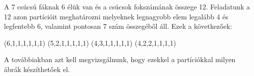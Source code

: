 \begin{solution}
A 7 csúcsú fáknak 6 élük van és a csúcsok fokszámának összege 12.
Feladatunk a 12 azon partícióit meghatározni melyeknek legnagyobb
elem legalább 4 és legfentebb 6, valamint pontosan 7 szám összegéből
áll. Ezek a következőek:

\hspace{0cm}

\hspace{0.3cm} (6,1,1,1,1,1,1) \hspace{0.5cm} (5,2,1,1,1,1,1) \hspace{0.5cm}
(4,3,1,1,1,1,1) \hspace{0.5cm} (4,2,2,1,1,1,1)

\hspace{0cm}

A továbbiakban azt kell megvizsgálnunk, hogy ezekkel a partíciókkal
milyen ábrák készíthetőek el.


\end{solution}
